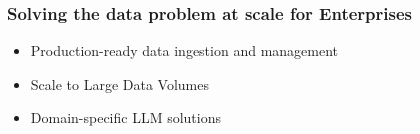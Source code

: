 \begin{frame}[fragile]\frametitle{Solving the data problem at scale for Enterprises}


\begin{itemize}
\item Production-ready data ingestion and management
\item Scale to Large Data Volumes
\item Domain-specific LLM solutions
\end{itemize}	

\end{frame}
